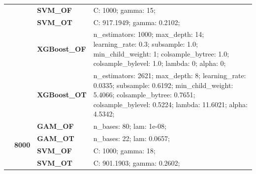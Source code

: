 \documentclass[runningheads]{llncs}
\begin{document}
\begin{table}
\begin{tabularx}{\textwidth}{>{\RaggedRight\arraybackslash}m{1.6cm}p{1.225cm}p{2.05cm}>{\RaggedRight\arraybackslash}X}
        \textbf{}                               & \textbf{}                         & \textbf{SVM\_OF}     & C: 1000; gamma: 15;                                                                                                                                                                               \\
        \textbf{}                               & \textbf{}                         & \textbf{SVM\_OT}     & C: 917.1949; gamma: 0.2102;                                                                                                                                                                       \\
        \textbf{}                               & \textbf{}                         & \textbf{XGBoost\_OF} & n\_estimators: 1000; max\_depth: 14; learning\_rate: 0.3; subsample: 1.0; min\_child\_weight: 1; colsample\_bytree: 1.0; colsample\_bylevel: 1.0; lambda: 0; alpha: 0;                            \\
        \textbf{}                               & \textbf{}                         & \textbf{XGBoost\_OT} & n\_estimators: 2621; max\_depth: 8; learning\_rate: 0.0335; subsample: 0.6192; min\_child\_weight: 5.4066; colsample\_bytree: 0.7651; colsample\_bylevel: 0.5224; lambda: 11.6021; alpha: 4.5342; \\
        \cline{2-4}
        \textbf{}                               & \multirow[t]{7}{*}{\textbf{8000}} & \textbf{GAM\_OF}     & n\_bases: 80; lam: 1e-08;                                                                                                                                                                         \\
        \textbf{}                               & \textbf{}                         & \textbf{GAM\_OT}     & n\_bases: 22; lam: 0.0657;                                                                                                                                                                        \\
        \textbf{}                               & \textbf{}                         & \textbf{SVM\_OF}     & C: 1000; gamma: 18;                                                                                                                                                                               \\
        \textbf{}                               & \textbf{}                         & \textbf{SVM\_OT}     & C: 901.1903; gamma: 0.2602;                                                                                                                                                                       \\

\end{tabularx}
\end{table}
\end{document}
